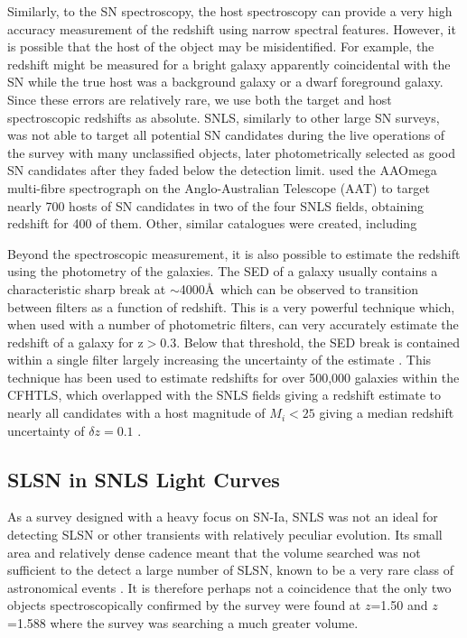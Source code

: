 Similarly, to the SN spectroscopy, the host spectroscopy can provide a very high accuracy measurement of the redshift using narrow spectral features. However, it is possible that the host of the object may be misidentified. For example, the redshift might be measured for a bright galaxy apparently coincidental with the SN while the true host was a background galaxy or a dwarf foreground galaxy. Since these errors are relatively rare, we use both the target and host spectroscopic redshifts as absolute. SNLS, similarly to other large SN surveys, was not able to target all potential SN candidates during the live operations of the survey with many unclassified objects, later photometrically selected as good SN candidates after they faded below the detection limit. \citet{Lidman2012} used the AAOmega multi-fibre spectrograph on the Anglo-Australian Telescope (AAT) to target nearly 700 hosts of SN candidates in two of the four SNLS fields, obtaining redshift for 400 of them. Other, similar catalogues were created, including \citet{Lilly2007,LeFevre2013}

Beyond the spectroscopic measurement, it is also possible to estimate the redshift using the photometry of the galaxies. The SED of a galaxy usually contains a characteristic sharp break at $\sim$4000\AA ~which can be observed to transition between filters as a function of redshift. This is a very powerful technique which, when used with a number of photometric filters, can very accurately estimate the redshift of a galaxy for z$>$0.3. Below that threshold, the SED break is contained within a single filter largely increasing the uncertainty of the estimate \citep{Connolly1995}. This technique has been used to estimate redshifts for over 500,000 galaxies within the CFHTLS, which overlapped with the SNLS fields giving a redshift estimate to nearly all candidates with a host magnitude of $M_{i}<25$ giving a median redshift uncertainty of $\delta z = 0.1$ \citep{Ilbert2006}.

\subsection{SLSN in SNLS Light Curves}
As a survey designed with a heavy focus on SN-Ia, SNLS was not an ideal for detecting SLSN or other transients with relatively peculiar evolution. Its small area and relatively dense cadence meant that the volume searched was not sufficient to the detect a large number of SLSN, known to be a very rare class of astronomical events \citep{Cooke2012,Prajs2016,Quimby2013}. It is therefore perhaps not a coincidence that the only two objects spectroscopically confirmed by the survey were found at $z$=1.50 and $z$=1.588 where the survey was searching a much greater volume.

